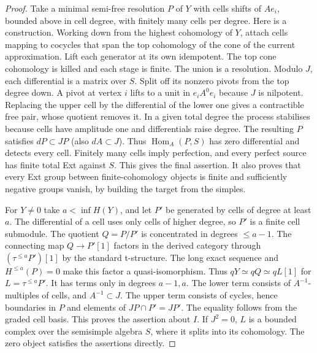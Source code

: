 \documentclass[11pt]{article}
\newcommand{\Hom}{\operatorname{Hom}}
\begin{document}
\begin{proof}
Take a minimal semi-free resolution $P$ of $Y$ with cells shifts of
$Ae_i$, bounded above in cell degree, with finitely many cells per degree.
Here is a construction. Working down from the highest cohomology of $Y$,
attach cells mapping to cocycles that span the top cohomology of the
cone of the current approximation. Lift each generator at its own
idempotent. The top cone cohomology is killed and each stage is finite.
The union is a resolution. Modulo $J$, each differential is a matrix over
$S$. Split off its nonzero pivots from the top degree down. A pivot at
vertex $i$ lifts to a unit in $e_iA^0e_i$ because $J$ is nilpotent.
Replacing the upper cell by the differential of the lower one gives a
contractible free pair, whose quotient removes it. In a given total degree
the process stabilises because cells have amplitude one and differentials
raise degree. The resulting $P$ satisfies $dP\subset JP$ (also $dA\subset
J$). Thus $\Hom_A(P,S)$ has zero differential and detects every cell.
Finitely many cells imply perfection, and every perfect source has finite
total Ext against $S$. This gives the final assertion. It also proves that
every Ext group between finite-cohomology objects is finite and sufficiently
negative groups vanish, by building the target from the simples.

For $Y\ne0$ take $a<\inf H(Y)$, and let $P'$ be generated by cells of
degree at least $a$. The differential of a cell uses only cells of higher
degree, so $P'$ is a finite cell submodule. The quotient $Q=P/P'$ is
concentrated in degrees $\le a-1$. The connecting map $Q\to P'[1]$ factors
in the derived category through $(\tau^{\le a}P')[1]$ by the standard
t-structure. The long exact sequence and $H^{\le a}(P)=0$ make this
factor a quasi-isomorphism. Thus $qY\simeq qQ\simeq qL[1]$ for
$L=\tau^{\le a}P'$. It has terms only in degrees $a-1,a$. The lower
term consists of $A^{-1}$-multiples of cells, and $A^{-1}\subset J$.
The upper term consists of cycles, hence boundaries in $P$ and elements
of $JP\cap P'=JP'$. The equality follows from the graded cell basis.
This proves the assertion about $I$. If $J^2=0$, $L$ is a bounded
complex over the semisimple algebra $S$, where it splits into its cohomology.
The zero object satisfies the assertions directly.
\end{proof}
\end{document}
